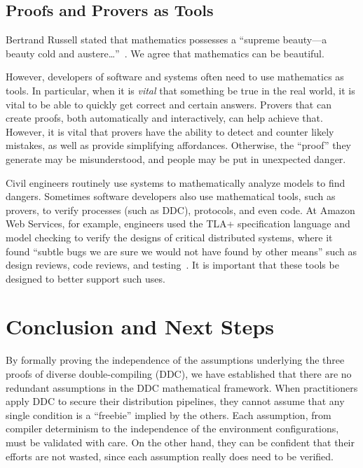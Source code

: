 \subsection{Proofs and Provers as Tools}

Bertrand Russell stated that mathematics possesses a ``supreme beauty---a beauty cold and austere\ldots''~\cite{russell1910study}. We agree that mathematics can be beautiful.

However, developers of software and systems often need to use mathematics as tools. In particular, when it is \emph{vital} that something be true in the real world, it is vital to be able to quickly get correct and certain answers. Provers that can create proofs, both automatically and interactively, can help achieve that. However, it is vital that provers have the ability to detect and counter likely mistakes, as well as provide simplifying affordances. Otherwise, the ``proof'' they generate may be misunderstood, and people may be put in unexpected danger.

Civil engineers routinely use systems to mathematically analyze models to find dangers. Sometimes software developers also use mathematical tools, such as provers, to verify processes (such as DDC), protocols, and even code. At Amazon Web Services, for example, engineers used the TLA+ specification language and model checking to verify the designs of critical distributed systems, where it found ``subtle bugs we are sure we would not have found by other means'' such as design reviews, code reviews, and testing~\cite{newcombe2015aws}. It is important that these tools be designed to better support such uses.

\section{Conclusion and Next Steps}

By formally proving the independence of the assumptions underlying the three proofs of diverse double-compiling (DDC), we have established that there are no redundant assumptions in the DDC mathematical framework. When practitioners apply DDC to secure their distribution pipelines, they cannot assume that any single condition is a ``freebie'' implied by the others. Each assumption, from compiler determinism to the independence of the environment configurations, must be validated with care. On the other hand, they can be confident that their efforts are not wasted, since each assumption really does need to be verified.

